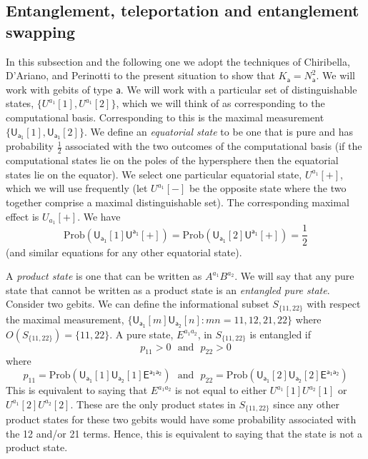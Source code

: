 \documentclass[10pt]{article}
\begin{document}
\subsection{Entanglement, teleportation and entanglement swapping}



In this subsection and the following one we adopt the techniques of Chiribella, D'Ariano, and Perinotti to the present situation to show that $K_\mathsf{a}=N^2_\mathsf{a}$.   We will work with gebits of type $\mathsf{a}$.  We will work with a particular set of distinguishable states, $\{U^{a_1}[1], U^{a_1}[2] \}$, which we will think of as corresponding to the computational basis. Corresponding to this is the maximal measurement $\{\mathsf{U_{a_1}}[1], \mathsf{U_{a_1}}[2]\}$.   We define an \emph{equatorial state} to be one that is pure and has probability $\frac{1}{2}$ associated with the two outcomes of the computational basis (if the computational states lie on the poles of the hypersphere then the equatorial states lie on the equator).   We select one particular equatorial state, $U^{a_1}[+]$, which we will use frequently (let $U^{a_1}[-]$ be the opposite state where the two together comprise a maximal distinguishable set).  The corresponding maximal effect is $U_{a_1}[+]$. We have
\begin{equation}
\text{Prob}(\mathsf{U_{a_1}}[1]\mathsf{U^{a_1}}[+]) = \text{Prob}(\mathsf{U_{a_1}}[2]\mathsf{U^{a_1}}[+]) = \frac{1}{2}
\end{equation}
(and similar equations for any other equatorial state).

A \emph{product state} is one that can be written as $A^{a_1}B^{a_2}$.  We will say that any pure state that cannot be written as a product state is an \emph{entangled pure state}.  Consider two gebits.  We can define the informational subset $S_{\{11,22\} }$ with respect the maximal measurement,
$\{\mathsf{U_{a_1}}[m] \mathsf{U_{a_2}}[n]: mn=11, 12, 21, 22 \}$ where $O(S_{\{11,22\} })= \{11,22\}$.   A pure state, $E^{a_1a_2}$,  in $S_{\{11,22\} }$ is entangled if
\begin{equation}\label{pEconditions}
p_{11}>0 ~~~\text{and} ~~~ p_{22} >0
\end{equation}
where
\begin{equation}\label{pEdefs}
p_{11}=\text{Prob}(\mathsf{U_{a_1}}[1]\mathsf{U_{a_2}}[1] \mathsf{E^{a_1a_2}}) ~~~\text{and}~~~ p_{22}= \text{Prob}(\mathsf{U_{a_1}}[2]\mathsf{U_{a_2}}[2] \mathsf{E^{a_1a_2}})
\end{equation}
This is equivalent to saying that $E^{a_1a_2}$ is not equal to either $U^{a_1}[1]U^{a_2}[1]$ or $U^{a_1}[2]U^{a_2}[2]$.  These are the only product states in $S_{\{11,22\}}$ since any other product states for these two gebits would have some probability associated with the 12 and/or 21 terms. Hence, this is equivalent to saying that the state is not a product state.
\end{document}

